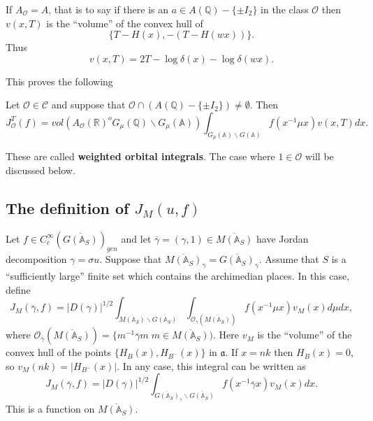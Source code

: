 If $A_{\mathcal{O}}=A$, that is to say if there is an
$a\in A({\mathbb{Q}})-\{\pm I_2\}$ in the class ${\mathcal{O}}$
then $v(x,T)$ is the ``volume'' of the convex hull of 
\[
\{T-H(x),-(T-H(wx))\}. 
\]
Thus 
\begin{equation}\label{eq:4.18}
v(x,T)=2T-\log \delta(x)-\log \delta(wx).
\end{equation}

This proves the following

\begin{theorem}\label{thm:4.10}
Let ${\mathcal{O}}\in \mathcal{C}$ and suppose that
${\mathcal{O}}\cap (A({\mathbb{Q}})-\{\pm I_2\})\not=\emptyset $.
Then 
\[
J_{\mathcal{O}}^T(f)
=vol(A_{\mathcal{O}}({\mathbb{R}})^oG_\mu ({\mathbb{Q}})\backslash G_\mu ({\mathbb{A}}))
\int_{G_\mu ({\mathbb{A}})\backslash G({\mathbb{A}})}f(x^{-1}\mu x)v(x,T)dx. 
\]
\end{theorem}

These are called \textbf{weighted orbital integrals}.
The case where $1\in {\mathcal{O}}$ will be discussed below.

\subsection{The definition of $J_M(u,f)$}\label{ssec:JMu}

Let $f\in C_c^\infty (\overline{G({\mathbb {A}}_S)})_{gen}$ and let
$\overline{\gamma}=(\gamma,1) \in \overline{M({\mathbb {A}}_S)}$
have Jordan decomposition
$\gamma =\sigma u$. Suppose that
$\overline{M({\mathbb{A}}_S)}_{\overline{\gamma}}
=\overline{G({\mathbb{A}}_S)}_{\overline{\gamma}} $.
Assume that $S$ is a ``sufficiently large'' finite set which contains
the archimedian places. In this case, define 
\begin{equation}\label{eq:4.19}
J_M(\overline{\gamma} ,f)=|D(\gamma )|^{1/2}
\int_{\overline{M({\mathbb {A}}_S)}
\backslash \overline{G({\mathbb {A}}_S)}}
\int_{{\mathcal O}_{\overline{\gamma}} (\overline{M({\mathbb {A}}_S)})}
f(x^{-1}\mu x)v_M(x)d\mu dx,
\end{equation}
where ${\mathcal O}_{\overline{\gamma}} (\overline{M({\mathbb {A}}_S)})
=\{m^{-1}\overline{\gamma} m\;m\in \overline{M({\mathbb {A}}_S)})$.
Here $v_M$ is the ``volume'' of the convex hull of the points
$\{H_B(x),H_{B^{-}}(x)\}$ in ${\mathfrak a}$. If $x=nk$ then
$H_B(x)=0$, so $v_M(nk)=|H_{B^{-}}(x)|$.
In any case, this integral can be written as 
\[
J_M(\overline{\gamma} ,f)=|D(\gamma )|^{1/2}
\int_{\overline{G({\mathbb {A}}_S)}_{\overline{\gamma}}
\backslash \overline{G({\mathbb{A}}_S)}}
f(x^{-1}\overline{\gamma} x)v_M(x)dx. 
\]
This is a function on $\overline{M({\mathbb {A}}_S)}$.

